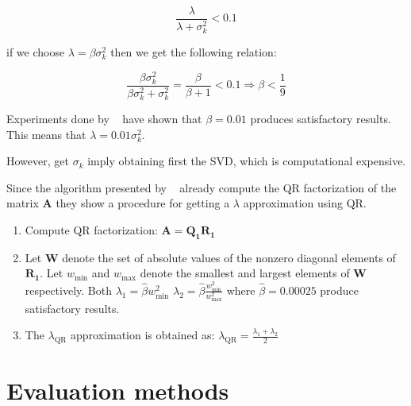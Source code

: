 \[
\frac{\lambda}{\lambda + \sigma_k^2} < 0.1
\]

\noindent if we choose $\lambda=\beta \sigma_k^2$ then we get the following
relation:


\[
\frac{\beta \sigma_k^2}{\beta \sigma_k^2 + \sigma_k^2} =
\frac{\beta}{\beta+1} < 0.1 \Rightarrow \beta < \frac{1}{9}  
\]

Experiments done by ~\cite{coleman+sun2010} have shown that $\beta = 0.01$
produces satisfactory results. This means that $\lambda = 0.01 \sigma_k^2$.

However, get $\sigma_k$ imply obtaining first the SVD, which is
computational expensive.

Since the algorithm presented by ~\cite{coleman+sun2010} already compute the QR
factorization of the matrix $\mathbf{A}$ they show a procedure for getting
a $\lambda$ approximation using QR.

\begin{enumerate}
\item Compute QR factorization: $\mathbf{A} = \mathbf{Q_1R_1}$
\item Let $\mathbf{W}$ denote the set of absolute values of the nonzero diagonal
elements of $\mathbf{R_1}$. Let $w_{\text{min}}$ and $w_{\text{max}}$ denote the
smallest and largest elements of $\mathbf{W}$ respectively. Both 
$\lambda_1 = \hat{\beta} w_{\text{min}}^2$
$\lambda_2 = \hat{\beta} \frac{w_{\text{min}}^2}{w_{\text{max}}^2}$ where
$\hat{\beta}=0.00025$ produce satisfactory results.
\item The $\lambda_{\text{QR}}$ approximation is obtained as:
$\lambda_{\text{QR}} = \frac{\lambda_1 + \lambda_2}{2}$  
\end{enumerate}

\newpage

\section{Evaluation methods} \label{sec:evaluation}

